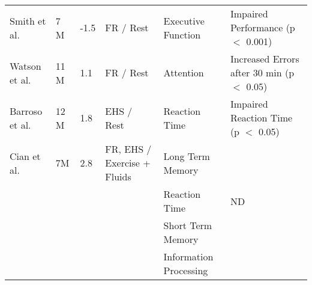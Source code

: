 \begin{appendices}
{\begin{longtable}{llllll}
		Smith et al. \cite{smith_effect_2012} & 7 M & -1.5 & FR  / Rest & Executive Function & Impaired Performance (p ${<}$ 0.001) \\
		
		Watson et al. \cite{watson_mild_2015} & 11 M & 1.1 & FR / Rest & Attention & Increased Errors after 30 min (p ${<}$ 0.05) \\
		
		Barroso et al. \cite{barroso_hydration_2014} & 12 M & 1.8 & EHS / Rest & Reaction Time & Impaired Reaction Time  (p ${<}$ 0.05) \\
		
		Cian et al. \cite{cian_effects_2001} & 7M & 2.8 & FR, EHS / Exercise + Fluids & Long Term Memory & \\
		&&&& Reaction Time & ND \\
		&&&& Short Term Memory &  \\
		&&&& Information Processing & \\
	
	
	
%		
%		
%		
%		
%		
		
\end{longtable}}
		

\end{appendices}
